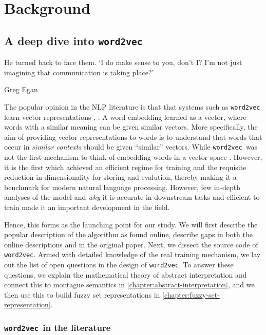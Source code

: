 \documentclass[11pt]{book}
\newcommand{\wtov}{\texttt{word2vec }}
\begin{document}
\chapter{Background}
\section{A deep dive into \wtov}
\label{chapter:deep-dive-wtov}

\epigraph{He turned back to face them. ‘I do make sense to you, don’t I? I’m not just imagining that communication is taking place?'}{Greg Egan}

The popular opinion in the NLP literature
is that that systems such as \texttt{word2vec} learn
vector representations \cite{levy2014neural}, \cite{pennington2014glove}.  A word
embedding learned as a vector, where words with a similar meaning can be given
similar vectors. More specifically, the aim of providing vector representations
to words is to understand that words that occur in \textit{similar contexts}
should be given ``similar'' vectors. While \wtov was not the first mechanism to
think of embedding words in a vector space
\cite{baroni2010distributional,bruni2012distributional}. However, it is the
first which achieved an efficient regime for training and the requisite
reduction in dimensionality for storing and evalution, thereby making it a
benchmark for modern natural language processing. However, few in-depth analyses
of the model and \textit{why} it is accurate in downstream tasks and efficient
to train made it an important development in the field.


Hence, this forms as the launching point for our study. We will
first describe the popular description of the algorithm as found online, describe
gaps in both the online descriptions and in the original paper. Next, we dissect the
source code of \texttt{word2vec}. Armed with detailed knowledge of the real
training mechanism, we lay out the list of open questions in the design of
\texttt{word2vec}. 
To answer these questions, we explain the mathematical
theory of abstract interpretation and connect this to montague semantics in
\autoref{chapter:abstract-interpretation}, and we then use this to build fuzzy
set representations in \autoref{chapter:fuzzy-set-representation}.

\subsection{\wtov in the literature}
\end{document}
